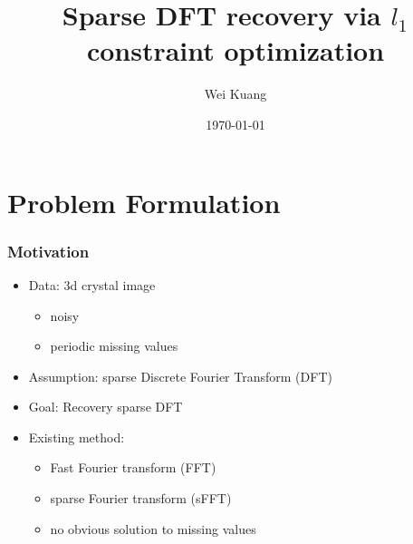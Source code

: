 \documentclass{beamer}
\title[Sparse DFT recovery]{Sparse DFT recovery via $l_1$ constraint optimization } %
\author{Wei Kuang} %
\institute[UChicago] %
{
Department of Statistics, University of Chicago \\ %
\medskip
\textit{weikuang@uchicago.edu} %
}
\date{\today} %
\begin{document}
\begin{frame}
\titlepage %
\end{frame}




\section{Problem Formulation} %

\begin{frame}
\frametitle{Motivation}
\begin{itemize}
    \item Data: 3d crystal image
    \begin{itemize}
        \item noisy
        \item periodic missing values
    \end{itemize}
    \item Assumption: sparse Discrete Fourier Transform (DFT)
    \item Goal: Recovery sparse DFT
    \item Existing method:
    \begin{itemize}
        \item Fast Fourier transform (FFT)
        \item sparse Fourier transform (sFFT) \cite{p1}
        \item no obvious solution to missing values
    \end{itemize}
\end{itemize}
\end{frame}
\end{document}
